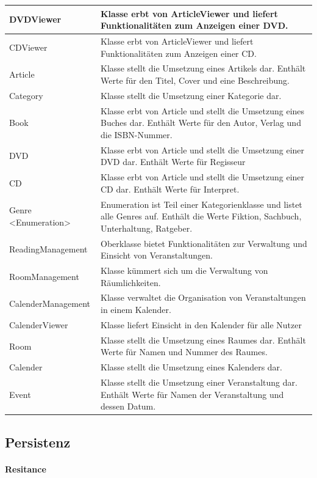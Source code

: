 \documentclass[a4paper]{article}
\begin{document}
\begin{longtable}{|p{100px}|p{250px}|}
	DVDViewer & Klasse erbt von ArticleViewer und liefert Funktionalitäten zum Anzeigen einer DVD. \\ \hline
	CDViewer & Klasse erbt von ArticleViewer und liefert Funktionalitäten zum Anzeigen einer CD. \\ \hline
	Article & Klasse stellt die Umsetzung eines Artikels dar. Enthält Werte für den Titel, Cover und eine Beschreibung. \\ \hline
	Category & Klasse stellt die Umsetzung einer Kategorie dar. \\ \hline
	Book & Klasse erbt von Article und stellt die Umsetzung eines Buches dar. Enthält Werte für den Autor, Verlag und die ISBN-Nummer. \\ \hline
	DVD & Klasse erbt von Article und stellt die Umsetzung einer DVD dar. Enthält Werte für Regisseur \\ \hline
	CD & Klasse erbt von Article und stellt die Umsetzung einer CD dar. Enthält Werte für Interpret. \\ \hline
	Genre <Enumeration> & Enumeration ist Teil einer Kategorienklasse und listet alle Genres auf. Enthält die Werte Fiktion, Sachbuch, Unterhaltung, Ratgeber. \\ \hline
	ReadingManagement & Oberklasse bietet Funktionalitäten zur Verwaltung und Einsicht von Veranstaltungen. \\ \hline
	RoomManagement & Klasse kümmert sich um die Verwaltung von Räumlichkeiten. \\ \hline
	CalenderManagement & Klasse verwaltet die Organisation von Veranstaltungen in einem Kalender. \\ \hline
	CalenderViewer & Klasse liefert Einsicht in den Kalender für alle Nutzer \\ \hline
	Room & Klasse stellt die Umsetzung eines Raumes dar. Enthält Werte für Namen und Nummer des Raumes. \\ \hline
	Calender & Klasse stellt die Umsetzung eines Kalenders dar. \\ \hline
	Event & Klasse stellt die Umsetzung einer Veranstaltung dar. Enthält Werte für Namen der Veranstaltung und dessen Datum. \\ \hline
\end{longtable}

\subsection{Persistenz}

\paragraph{Resitance}
\end{document}
